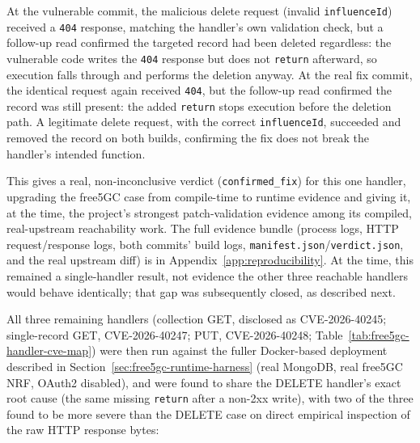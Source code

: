 \documentclass[12pt,a4paper]{report}
\begin{document}
At the vulnerable commit, the malicious delete request (invalid \texttt{influenceId}) received a \texttt{404} response, matching the handler's own validation check, but a follow-up read confirmed the targeted record had been deleted regardless: the vulnerable code writes the \texttt{404} response but does not \texttt{return} afterward, so execution falls through and performs the deletion anyway. At the real fix commit, the identical request again received \texttt{404}, but the follow-up read confirmed the record was still present: the added \texttt{return} stops execution before the deletion path. A legitimate delete request, with the correct \texttt{influenceId}, succeeded and removed the record on both builds, confirming the fix does not break the handler's intended function.

This gives a real, non-inconclusive verdict (\texttt{confirmed\_fix}) for this one handler, upgrading the free5GC case from compile-time to runtime evidence and giving it, at the time, the project's strongest patch-validation evidence among its compiled, real-upstream reachability work. The full evidence bundle (process logs, HTTP request/response logs, both commits' build logs, \texttt{manifest.json}/\texttt{verdict.json}, and the real upstream diff) is in Appendix~\ref{app:reproducibility}. At the time, this remained a single-handler result, not evidence the other three reachable handlers would behave identically; that gap was subsequently closed, as described next.

All three remaining handlers (collection GET, disclosed as CVE-2026-40245; single-record GET, CVE-2026-40247; PUT, CVE-2026-40248; Table~\ref{tab:free5gc-handler-cve-map}) were then run against the fuller Docker-based deployment described in Section~\ref{sec:free5gc-runtime-harness} (real MongoDB, real free5GC NRF, OAuth2 disabled), and were found to share the DELETE handler's exact root cause (the same missing \texttt{return} after a non-2xx write), with two of the three found to be more severe than the DELETE case on direct empirical inspection of the raw HTTP response bytes:
\end{document}

